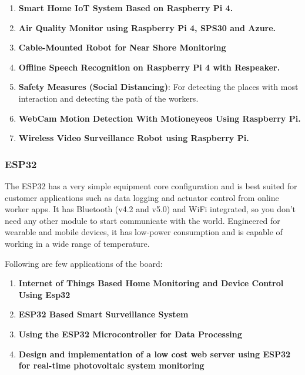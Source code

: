 \documentclass[a4paper,11pt]{article}
\begin{document}
\begin{iotsolution}
\begin{enumerate}
\item \textbf{Smart Home IoT System Based on Raspberry Pi 4.}

\item \textbf{Air Quality Monitor using Raspberry Pi 4, SPS30 and Azure.}

\item \textbf{Cable-Mounted Robot for Near Shore Monitoring }\cite{snow2020design}
\item \textbf{Offline Speech Recognition on Raspberry Pi 4 with Respeaker.}

\item \textbf{Safety Measures (Social Distancing)}: For detecting the places with most interaction and detecting the path of the workers. 

\item \textbf{WebCam Motion Detection With Motioneyeos Using Raspberry Pi.} 

\item \textbf{Wireless Video Surveillance Robot using Raspberry Pi.} 
\end{enumerate}

\subsubsection*{ESP32}
The ESP32 has a very simple equipment core configuration and is best suited for customer applications such as data logging and actuator control from online worker apps\cite{[A7]}. It has Bluetooth (v4.2 and v5.0) and WiFi integrated, so you don’t need any other module to start communicate with the world. Engineered for wearable and mobile devices, it has low-power consumption and is capable of working in a wide range of temperature.\cite{[A6]}

Following are few applications of the board:
\begin{enumerate}
\item \textbf{Internet of Things Based Home Monitoring and Device Control Using Esp32 }\cite{pravalika2019internet}

\item \textbf{ESP32 Based Smart Surveillance System }\cite{rai2019esp32}

\item \textbf{Using the ESP32 Microcontroller for Data Processing} \cite{babiuch2019using}

\item \textbf{Design and implementation of a low cost web server using ESP32 for real-time photovoltaic system monitoring }\cite{allafi2017design}


\end{enumerate}
\end{iotsolution}
\end{document}
